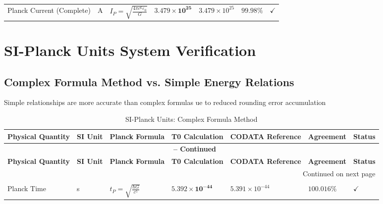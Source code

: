 \documentclass[12pt,a4paper]{article}
\begin{document}
\begin{landscape}
\begin{longtable}{p{5.5cm}p{1.8cm}p{4cm}p{3.5cm}p{3.5cm}p{1.8cm}p{1cm}}
			Planck Current (Complete) & A & $I_P = \sqrt{\frac{4\pi c^6\varepsilon_0}{G}}$ & $\mathbf{3.479 \times 10^{25}}$ & $3.479 \times 10^{25}$ & $\mathbf{99.98\%}$ & $\checkmark$ \\
			
		\end{longtable}
		\normalsize

	
	\section{SI-Planck Units System Verification}
	
	\subsection{Complex Formula Method vs. Simple Energy Relations}
	
{\large 	Simple relationships are more accurate than complex formulas ue to reduced rounding error accumulation	}

		\footnotesize
		\begin{longtable}{p{4cm}p{1.8cm}p{3.8cm}p{3.2cm}p{3.2cm}p{1.8cm}p{1cm}}
			\caption{SI-Planck Units: Complex Formula Method} \\
			\toprule
			\textbf{Physical Quantity} & \textbf{SI Unit} & \textbf{Planck Formula} & \textbf{T0 Calculation} & \textbf{CODATA Reference} & \textbf{Agreement} & \textbf{Status} \\
			\midrule
			\endfirsthead
			
			\multicolumn{7}{c}{{\bfseries \tablename\ \thetable{} -- Continued}} \\
			\toprule
			\textbf{Physical Quantity} & \textbf{SI Unit} & \textbf{Planck Formula} & \textbf{T0 Calculation} & \textbf{CODATA Reference} & \textbf{Agreement} & \textbf{Status} \\
			\midrule
			\endhead
			
			\bottomrule
			\multicolumn{7}{r}{{Continued on next page}} \\
			\endfoot
			
			\bottomrule
			\endlastfoot
			
			\multicolumn{7}{l}{\textbf{PLANCK UNITS FROM COMPLEX FORMULAS}} \\
			\midrule
			Planck Time & s & $t_P = \sqrt{\frac{\hbar G}{c^5}}$ & $\mathbf{5.392 \times 10^{-44}}$ & $5.391 \times 10^{-44}$ & $\mathbf{100.016\%}$ & $\checkmark$ \\
			

\end{longtable}
\end{landscape}
\end{document}
